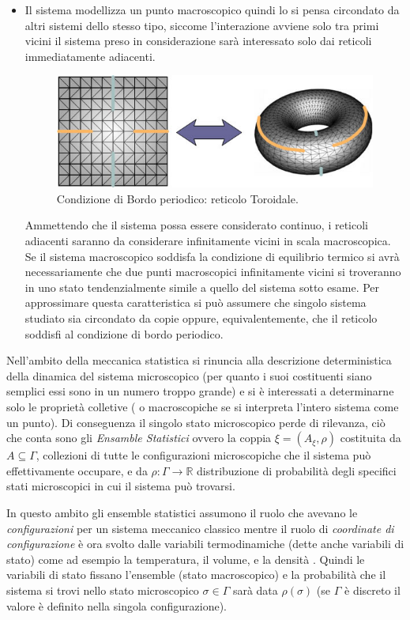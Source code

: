 \begin{itemize}
\item Il sistema modellizza un punto macroscopico quindi lo si pensa circondato da altri sistemi dello stesso tipo, siccome l'interazione avviene solo tra primi vicini il sistema preso in considerazione sarà interessato solo dai reticoli immediatamente adiacenti.
\begin{figure}[h!]
\centering
\includegraphics[scale=0.5]{Immagini/bordoperiodico.jpg}
\caption{Condizione di Bordo periodico: reticolo Toroidale.}\label{fig:2}
\end{figure}
Ammettendo che il sistema possa essere considerato continuo, i reticoli adiacenti saranno da considerare infinitamente vicini in scala macroscopica. 
Se il sistema macroscopico soddisfa la condizione di equilibrio termico si avrà necessariamente che due punti macroscopici infinitamente vicini si troveranno in uno stato tendenzialmente simile a quello del sistema sotto esame.
Per approssimare questa caratteristica si può assumere che singolo sistema studiato sia circondato da copie oppure, equivalentemente, che il reticolo soddisfi al condizione di bordo periodico.

\end{itemize}
\bigskip
Nell'ambito della meccanica statistica si rinuncia alla descrizione deterministica della dinamica del sistema microscopico (per quanto i suoi costituenti siano semplici essi sono in un numero troppo grande) e si è interessati a determinarne solo le proprietà colletive ( o macroscopiche se si interpreta l'intero sistema come un punto).
Di conseguenza il singolo stato microscopico perde di rilevanza, ciò che conta sono gli \emph{Ensamble Statistici} ovvero la coppia $\xi = (A_{\xi},\rho)$ costituita da $A\subseteq \Gamma$, collezioni di tutte le configurazioni microscopiche che il sistema può effettivamente occupare, e da $\rho:\Gamma \rightarrow \mathbb{R}$ distribuzione di probabilità degli specifici stati microscopici in cui il sistema può trovarsi.

In questo ambito gli ensemble statistici assumono il ruolo che avevano le \emph{configurazioni} per  un sistema meccanico classico mentre il ruolo di \emph{coordinate di configurazione} è ora svolto dalle variabili termodinamiche (dette anche variabili di stato) come ad esempio la temperatura, il volume, e la densità . 
Quindi le variabili di stato fissano l'ensemble (stato macroscopico) e la probabilità che il sistema si trovi nello stato microscopico $\sigma \in \Gamma$ sarà data $\rho(\sigma)$ (se $\Gamma$ è discreto il valore è definito nella singola configurazione).
\medskip


